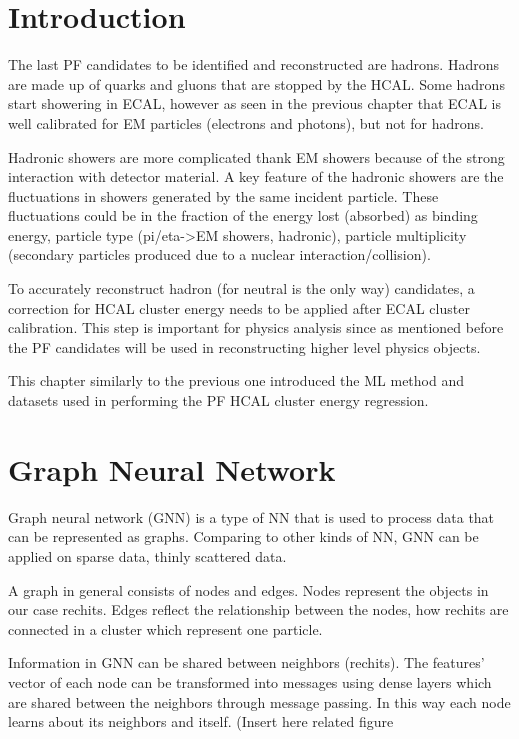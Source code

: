 \section{Introduction}
The last PF candidates to be identified and reconstructed are hadrons. Hadrons are made up of quarks and gluons that are stopped by the HCAL. Some hadrons start showering in ECAL, however as seen in the previous chapter that ECAL is well calibrated for EM particles (electrons and photons), but not for hadrons.

Hadronic showers are more complicated thank EM showers because of the strong interaction with detector material. A key feature of the hadronic showers are the fluctuations in showers generated by the same incident particle. These fluctuations could be in the fraction of the energy lost (absorbed) as binding energy, particle type (pi/eta->EM showers, hadronic), particle multiplicity (secondary particles produced due to a nuclear interaction/collision). %

To accurately reconstruct hadron (for neutral is the only way) candidates, a correction for HCAL cluster energy needs to be applied after ECAL cluster calibration. This step is important for physics analysis since as mentioned before the PF candidates will be used in reconstructing higher level physics objects.

This chapter similarly to the previous one introduced the ML method and datasets used in performing the PF HCAL cluster energy regression.

\section{Graph Neural Network} %
Graph neural network (GNN) is a type of NN that is used to process data that can be represented as graphs. Comparing to other kinds of NN, GNN can be applied on sparse data, thinly scattered data.

A graph in general consists of nodes and edges. Nodes represent the objects in our case rechits. Edges reflect the relationship between the nodes, how rechits are connected in a cluster which represent one particle.

Information in GNN can be shared between neighbors (rechits). The features’ vector of each node can be transformed into messages using dense layers which are shared between the neighbors through message passing. In this way each node learns about its neighbors and itself. (Insert here related figure %

